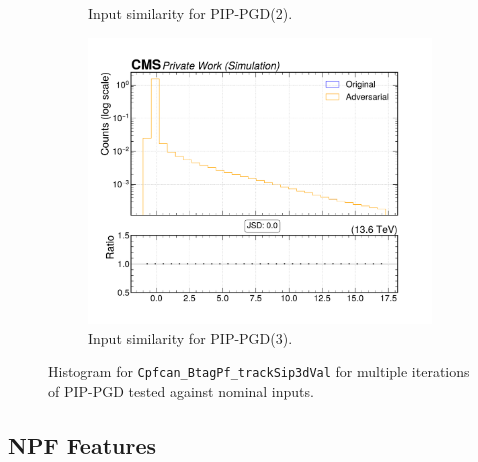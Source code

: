 \begin{figure}[htbp]
\begin{subfigure}[t]{0.32\textwidth}
    \caption*{Input similarity for PIP-PGD(2).}
  \end{subfigure}\hfill
  \begin{subfigure}[t]{0.32\textwidth}
    \includegraphics[width=\linewidth]{media/output/features/compare/combined_it_3/cmp_cpf_arr_Cpfcan_BtagPf_trackSip3dVal.pdf}
    \caption*{Input similarity for PIP-PGD(3).}
  \end{subfigure}

  \caption*{Histogram for \texttt{Cpfcan\_BtagPf\_trackSip3dVal} for multiple iterations of PIP-PGD tested against nominal inputs.}
  \label{fig:combined_input_Cpfcan_BtagPf_trackSip3dVal}
\end{figure}

\newpage
\subsection*{NPF Features}


